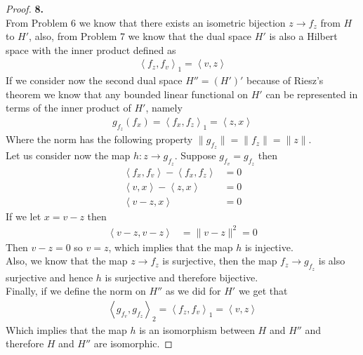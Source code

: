 \documentclass[11pt]{article}
\newcommand{\inprd}[1]{\left\langle{#1}\right\rangle}
\theoremstyle{definition}
\begin{document}
\cleardoublepage
\begin{proof}{\textbf{8.}}\\
From Problem 6 we know that there exists an isometric bijection
$z \to f_z$ from $H$ to $H'$, also, from Problem 7 we know that the dual 
space $H'$ is also a Hilbert space with the inner product defined as 
\begin{align*}
    \inprd{f_z, f_v}_1 = \inprd{v, z}
\end{align*}
If we consider now the second dual space $H'' = (H')'$ because of Riesz's
theorem we know that any bounded linear functional on $H'$ can be represented
in terms of the inner product of $H'$, namely
\begin{align*}
    g_{f_z}(f_x) = \inprd{f_x, f_z}_1 = \inprd{z, x}
\end{align*}
Where the norm has the following property $\|g_{f_z}\| = \|f_z\| = \|z\|$.\\
Let us consider now the map $h: z \to g_{f_z}$.
Suppose $g_{f_v} = g_{f_z}$ then
\begin{align*}
    \inprd{f_x, f_v} - \inprd{f_x, f_z} &= 0 \\
    \inprd{v, x} - \inprd{z, x} &= 0 \\
    \inprd{v - z, x} &= 0
\end{align*}
If we let $x = v - z$ then
\begin{align*}
    \inprd{v - z, v - z} &= \|v - z\|^2 = 0
\end{align*}
Then $v - z = 0$ so $v = z$, which implies that the map $h$ is injective. \\
Also, we know that the map $z \to f_z$ is surjective, then the map
$f_z \to g_{f_z}$ is also surjective and hence $h$ is surjective and therefore
bijective.\\
Finally, if we define the norm on $H''$ as we did for $H'$ we get that
\begin{align*}
    \inprd{g_{f_v}, g_{f_z}}_2 = \inprd{f_z, f_v}_1 = \inprd{v, z}
\end{align*}
Which implies that the map $h$ is an isomorphism between $H$ and $H''$
and therefore $H$ and $H''$ are isomorphic.
\end{proof}
\end{document}
